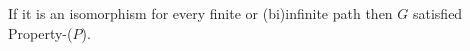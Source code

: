 \documentclass[preview]{standalone}
\begin{document}
\begin{center}
If it is an isomorphism for every finite or (bi)infinite path then $G$ satisfied Property-($P$).
\end{center}
\end{document}
